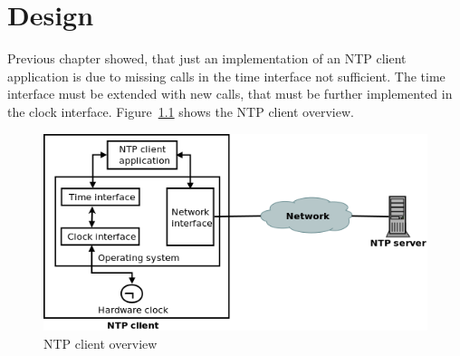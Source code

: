 
\chapter{Design}
Previous chapter showed, that just an implementation of an
NTP client application is due to missing calls in the time interface not sufficient.
The time interface must be extended with new calls,
that must be further implemented in the clock interface.
Figure~\ref{fig:design-overview} shows the NTP client overview.

\begin{figure}[H]
  \centering
  \includegraphics[width=13cm,keepaspectratio]{fig/design.png}
  \caption{NTP client overview} %
  \label{fig:design-overview} %
\end{figure}








%
